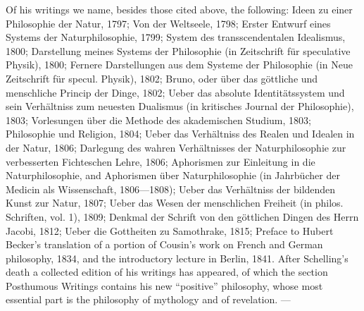Of his writings we name, besides those cited above, the following:
Ideen zu einer Philosophie der Natur, 1797; Von der Weltseele, 1798;
Erster Entwurf eines Systems der Naturphilosophie, 1799; System des
transscendentalen Idealismus, 1800; Darstellung meines Systems der
Philosophie (in Zeitschrift für speculative Physik), 1800; Fernere
Darstellungen aus dem Systeme der Philosophie (in Neue Zeitschrift für
specul. Physik), 1802; Bruno, oder über das göttliche und menschliche
Princip der Dinge, 1802; Ueber das absolute Identitätssystem und sein
Verhältniss zum neuesten Dualismus (in kritisches Journal der
Philosophie), 1803; Vorlesungen über die Methode des akademischen
Studium, 1803; Philosophie und Religion, 1804; Ueber das Verhältniss
des Realen und Idealen in der Natur, 1806; Darlegung des wahren
Verhältnisses der Naturphilosophie zur verbesserten Fichteschen Lehre,
1806; Aphorismen zur Einleitung in die Naturphilosophie, and
Aphorismen über Naturphilosophie (in Jahrbücher der Medicin als
Wissenschaft, 1806---1808); Ueber das Verhältniss der bildenden Kunst
zur Natur, 1807; Ueber das Wesen der menschlichen Freiheit (in philos.
Schriften, vol. 1), 1809; Denkmal der Schrift von den göttlichen Dingen
des Herrn Jacobi, 1812; Ueber die Gottheiten zu Samothrake, 1815;
Preface to Hubert Becker's translation of a portion of Cousin's work on
French and German philosophy, 1834, and the introductory lecture in
Berlin, 1841. After Schelling's death a collected edition of his
writings has appeared, of which the section Posthumous Writings
contains his new ``positive'' philosophy, whose most essential part is
the philosophy of mythology and of revelation. ---

\divrule

